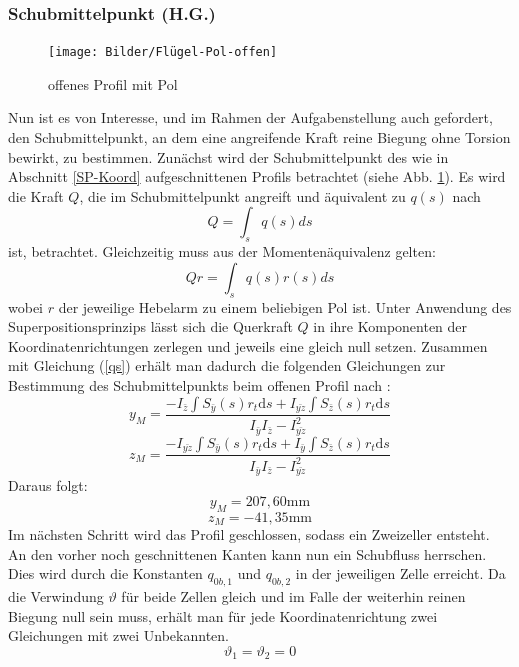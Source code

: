 \subsubsection{Schubmittelpunkt (H.G.)}
\begin{figure}[h]
	\centering
	\texttt{[image: Bilder/Flügel-Pol-offen]}
	\caption{offenes Profil mit Pol}
	\label{Fluegel2}
\end{figure}
Nun ist es von Interesse, und im Rahmen der Aufgabenstellung auch gefordert, den Schubmittelpunkt, an dem eine angreifende Kraft reine Biegung ohne Torsion bewirkt, zu bestimmen.
Zunächst wird der Schubmittelpunkt des wie in Abschnitt \ref{SP-Koord} aufgeschnittenen Profils betrachtet (siehe Abb. \ref{Fluegel2}). Es wird die Kraft $Q$, die im Schubmittelpunkt angreift und äquivalent zu $q(s)$ nach
\begin{equation}
	Q=\int_{s}^{}q(s)ds
\end{equation}
ist, betrachtet. Gleichzeitig muss aus der Momentenäquivalenz gelten:
\begin{equation}
	Qr=\int_{s}q(s)r(s)ds
\end{equation}
wobei $r$ der jeweilige Hebelarm zu einem beliebigen Pol ist. Unter Anwendung des Superpositionsprinzips lässt sich die Querkraft $Q$ in ihre Komponenten der Koordinatenrichtungen zerlegen und jeweils eine gleich null setzen. Zusammen mit Gleichung (\ref{qs}) erhält man dadurch die folgenden Gleichungen zur Bestimmung des Schubmittelpunkts beim offenen Profil nach \cite{item15}:
\begin{equation}
	y_{M}=\frac{-I_{\bar{z}}\int S_{\bar{y}}(s) r_{t}\mathrm{d}s+I_{\bar{yz}}\int S_{\bar{z}}(s) r_{t}\mathrm{d}s}{I_{\bar{y}}I_{\bar{z}}-I_{\bar{yz}}^2}
\end{equation}
\begin{equation}
	z_{M}=\frac{-I_{\bar{yz}}\int S_{\bar{y}}(s) r_{t}\mathrm{d}s+I_{\bar{y}}\int S_{\bar{z}}(s) r_{t}\mathrm{d}s}{I_{\bar{y}}I_{\bar{z}}-I_{\bar{yz}}^2}
\end{equation}
Daraus folgt:
$$
	y_{M}=207,60\mathrm{mm}
$$
$$
	z_{M}=-41,35\mathrm{mm}
$$
Im nächsten Schritt wird das Profil geschlossen, sodass ein Zweizeller entsteht. An den vorher noch geschnittenen Kanten kann nun ein Schubfluss herrschen. Dies wird durch die Konstanten $q_{0b,1}$ und $q_{0b,2}$ in der jeweiligen Zelle erreicht.
Da die Verwindung $\vartheta$ für beide Zellen gleich und im Falle der weiterhin reinen Biegung null sein muss, erhält man für jede Koordinatenrichtung zwei Gleichungen mit zwei Unbekannten.
\begin{equation}
	\vartheta_{1}=\vartheta_{2}=0
\end{equation}
